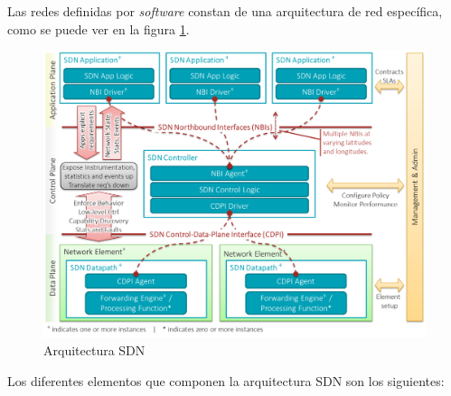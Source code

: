 Las redes definidas por \textit{software} constan de una arquitectura de red específica, como se puede ver en la figura \ref{fig:arquitecturasdn}.
 
\begin{figure}[!ht]
	\centering
	\includegraphics[width=0.75\linewidth]{imagenes/arquitectura_sdn}
	\caption{Arquitectura SDN}
	\label{fig:arquitecturasdn}
\end{figure}

Los diferentes elementos que componen la arquitectura SDN son los siguientes:

